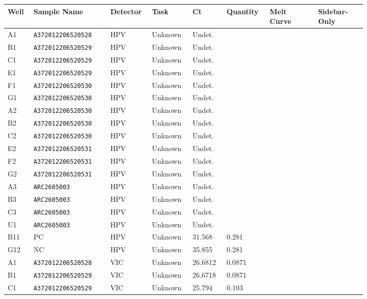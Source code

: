 \documentclass[UTF8,10pt,a4paper,fontset=fandol]{ctexart}
\begin{document}
\begin{center}
\scriptsize
\begin{tabular}{p{0.06\linewidth}p{0.19\linewidth}p{0.07\linewidth}p{0.09\linewidth}p{0.08\linewidth}p{0.09\linewidth}p{0.12\linewidth}p{0.12\linewidth}}
\hline
\textbf{Well} & \textbf{Sample Name} & \textbf{Detector} & \textbf{Task} &
\textbf{Ct} & \textbf{Quantity} & \textbf{Melt Curve} & \textbf{Sidebar-Only}\\
\hline
A1 & \texttt{A372012206520528} & HPV & Unknown & Undet. & & & \\
B1 & \texttt{A372012206520529} & HPV & Unknown & Undet. & & & \\
C1 & \texttt{A372012206520529} & HPV & Unknown & Undet. & & & \\
E1 & \texttt{A372012206520529} & HPV & Unknown & Undet. & & & \\
F1 & \texttt{A372012206520530} & HPV & Unknown & Undet. & & & \\
G1 & \texttt{A372012206520530} & HPV & Unknown & Undet. & & & \\
A2 & \texttt{A372012206520530} & HPV & Unknown & Undet. & & & \\
B2 & \texttt{A372012206520530} & HPV & Unknown & Undet. & & & \\
C2 & \texttt{A372012206520530} & HPV & Unknown & Undet. & & & \\
E2 & \texttt{A372012206520531} & HPV & Unknown & Undet. & & & \\
F2 & \texttt{A372012206520531} & HPV & Unknown & Undet. & & & \\
G2 & \texttt{A372012206520531} & HPV & Unknown & Undet. & & & \\
A3 & \texttt{ARC2605003} & HPV & Unknown & Undet. & & & \\
B3 & \texttt{ARC2605003} & HPV & Unknown & Undet. & & & \\
C3 & \texttt{ARC2605003} & HPV & Unknown & Undet. & & & \\
U1 & \texttt{ARC2605003} & HPV & Unknown & Undet. & & & \\
B11 & PC & HPV & Unknown & 31.568 & 0.281 & & \\
G12 & NC & HPV & Unknown & 35.855 & 0.281 & & \\
\hline
A1 & \texttt{A372012206520528} & VIC & Unknown & 26.6812 & 0.0871 & & \\
B1 & \texttt{A372012206520529} & VIC & Unknown & 26.6718 & 0.0871 & & \\
C1 & \texttt{A372012206520529} & VIC & Unknown & 25.794 & 0.103 & & \\

\end{tabular}
\end{center}
\end{document}

